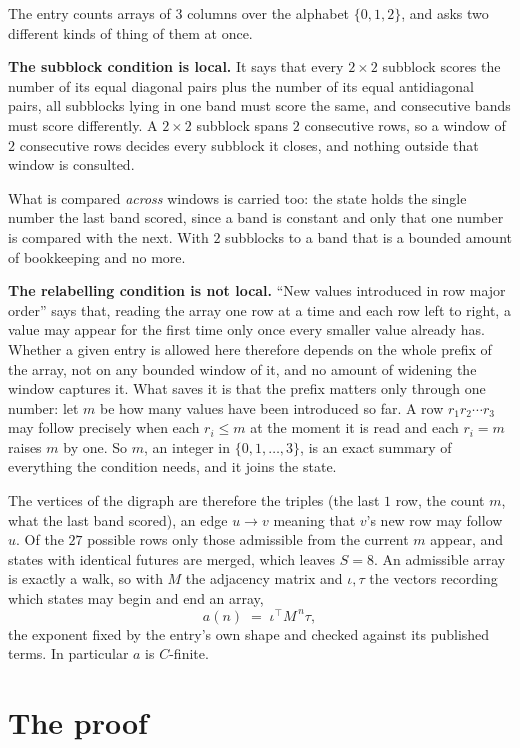 \documentclass[11pt,a4paper]{article}
\theoremstyle{plain}
\theoremstyle{definition}
\begin{document}
The entry counts arrays of 3 columns over the alphabet $\{0,1,2\}$, and asks two different kinds of thing of them at once.

\textbf{The subblock condition is local.} It says that every $2\times2$ subblock scores the number of its equal diagonal pairs plus the number of its equal antidiagonal pairs, all subblocks lying in one band must score the same, and consecutive bands must score differently. A $ 2\times2$ subblock spans $2$ consecutive rows, so a window of $2$ consecutive rows decides every subblock it closes, and nothing outside that window is consulted.

What is compared \emph{across} windows is carried too: the state holds the single number the last band scored, since a band is constant and only that one number is compared with the next. With $2$ subblocks to a band that is a bounded amount of bookkeeping and no more.

\textbf{The relabelling condition is not local.} ``New values introduced in row major order'' says that, reading the array one row at a time and each row left to right, a value may appear for the first time only once every smaller value already has. Whether a given entry is allowed here therefore depends on the whole prefix of the array, not on any bounded window of it, and no amount of widening the window captures it. What saves it is that the prefix matters only through one number: let $m$ be how many values have been introduced so far. A row $r_1r_2\cdots r_3$ may follow precisely when each $r_i\le m$ at the moment it is read and each $r_i=m$ raises $m$ by one. So $m$, an integer in $\{0,1,\dots,3\}$, is an exact summary of everything the condition needs, and it joins the state.

The vertices of the digraph are therefore the triples (the last $1$ row, the count $m$, what the last band scored), an edge $u\to v$ meaning that $v$'s new row may follow $u$. Of the $27$ possible rows only those admissible from the current $m$ appear, and states with identical futures are merged, which leaves $S=8$. An admissible array is exactly a walk, so with $M$ the adjacency matrix and $\iota,\tau$ the vectors recording which states may begin and end an array,
\[
a(n)\;=\;\iota^{\!\top}M^{\,n}\tau ,
\]
the exponent fixed by the entry's own shape and checked against its published terms. In
particular $a$ is $C$-finite.

\section{The proof}
\end{document}
